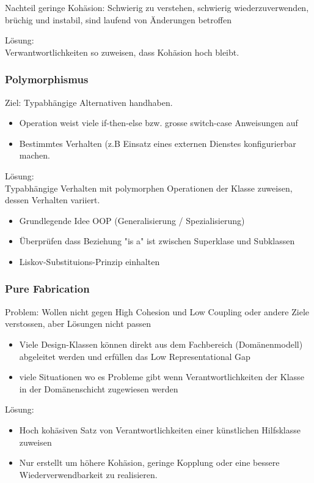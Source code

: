 \documentclass[../ZF_SWEN1.tex]{subfiles}
\begin{document}
{{Nachteil geringe Kohäsion: Schwierig zu verstehen, schwierig wiederzuverwenden, brüchig und instabil, sind laufend von Änderungen betroffen

Lösung:\\
Verwantwortlichkeiten so zuweisen, dass Kohäsion hoch bleibt.



\subsubsection{Polymorphismus}

Ziel: Typabhängige Alternativen handhaben.
\begin{itemize}
	\item Operation weist viele if-then-else bzw. grosse switch-case Anweisungen auf
	\item Bestimmtes Verhalten (z.B Einsatz eines externen Dienstes konfigurierbar machen.
\end{itemize}

Lösung:\\
Typabhängige Verhalten mit polymorphen Operationen der Klasse zuweisen, dessen Verhalten variiert.
\begin{itemize}
	\item Grundlegende Idee OOP (Generalisierung / Spezialisierung)
	\item Überprüfen dass Beziehung "is a" ist zwischen Superklase und Subklassen
	\item Liskov-Substituions-Prinzip einhalten
\end{itemize}

\subsubsection{Pure Fabrication}
Problem: Wollen nicht gegen High Cohesion und Low Coupling oder andere Ziele verstossen, aber Lösungen nicht passen
\begin{itemize}
	\item Viele Design-Klassen können direkt aus dem Fachbereich (Domänenmodell) abgeleitet werden und erfüllen das Low Representational Gap
	\item viele Situationen wo es Probleme gibt wenn Verantwortlichkeiten der Klasse in der Domänenschicht zugewiesen werden
\end{itemize}

Lösung:\\
\begin{itemize}
	\item Hoch kohäsiven Satz von Verantwortlichkeiten einer künstlichen Hilfsklasse zuweisen
	\item Nur erstellt um höhere Kohäsion, geringe Kopplung oder eine bessere Wiederverwendbarkeit zu realisieren.
\end{itemize}



}}
\end{document}

